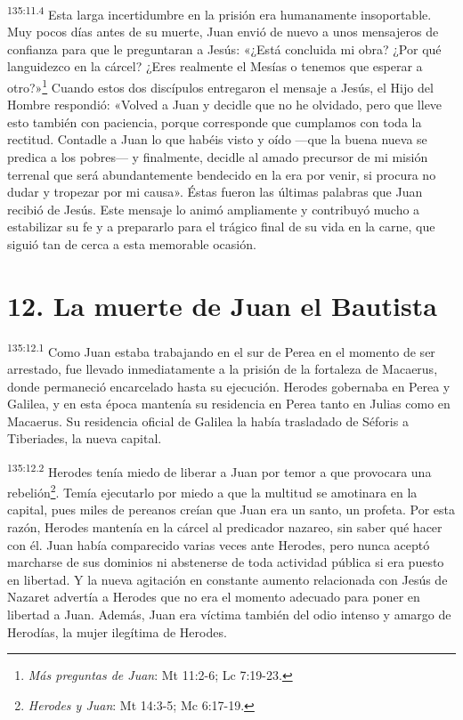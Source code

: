 \par
\textsuperscript{135:11.4} Esta larga incertidumbre en la prisión era humanamente insoportable. Muy pocos días antes de su muerte, Juan envió de nuevo a unos mensajeros de confianza para que le preguntaran a Jesús: «¿Está concluida mi obra? ¿Por qué languidezco en la cárcel? ¿Eres realmente el Mesías o tenemos que esperar a otro?»\footnote{\textit{Más preguntas de Juan}: Mt 11:2-6; Lc 7:19-23.} Cuando estos dos discípulos entregaron el mensaje a Jesús, el Hijo del Hombre respondió: «Volved a Juan y decidle que no he olvidado, pero que lleve esto también con paciencia, porque corresponde que cumplamos con toda la rectitud. Contadle a Juan lo que habéis visto y oído ---que la buena nueva se predica a los pobres--- y finalmente, decidle al amado precursor de mi misión terrenal que será abundantemente bendecido en la era por venir, si procura no dudar y tropezar por mi causa». Éstas fueron las últimas palabras que Juan recibió de Jesús. Este mensaje lo animó ampliamente y contribuyó mucho a estabilizar su fe y a prepararlo para el trágico final de su vida en la carne, que siguió tan de cerca a esta memorable ocasión.

\section*{12. La muerte de Juan el Bautista}
\par
\textsuperscript{135:12.1} Como Juan estaba trabajando en el sur de Perea en el momento de ser arrestado, fue llevado inmediatamente a la prisión de la fortaleza de Macaerus, donde permaneció encarcelado hasta su ejecución. Herodes gobernaba en Perea y Galilea, y en esta época mantenía su residencia en Perea tanto en Julias como en Macaerus. Su residencia oficial de Galilea la había trasladado de Séforis a Tiberiades, la nueva capital.

\par
\textsuperscript{135:12.2} Herodes tenía miedo de liberar a Juan por temor a que provocara una rebelión\footnote{\textit{Herodes y Juan}: Mt 14:3-5; Mc 6:17-19.}. Temía ejecutarlo por miedo a que la multitud se amotinara en la capital, pues miles de pereanos creían que Juan era un santo, un profeta. Por esta razón, Herodes mantenía en la cárcel al predicador nazareo, sin saber qué hacer con él. Juan había comparecido varias veces ante Herodes, pero nunca aceptó marcharse de sus dominios ni abstenerse de toda actividad pública si era puesto en libertad. Y la nueva agitación en constante aumento relacionada con Jesús de Nazaret advertía a Herodes que no era el momento adecuado para poner en libertad a Juan. Además, Juan era víctima también del odio intenso y amargo de Herodías, la mujer ilegítima de Herodes.

